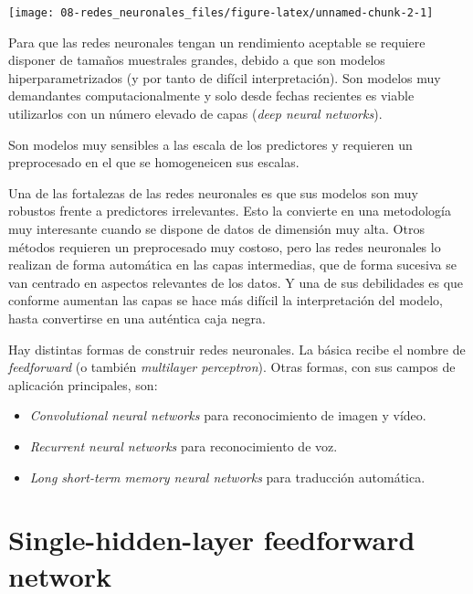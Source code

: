 \documentclass[
  spanish,
]{book}
\theoremstyle{break}
\theoremstyle{definition}
\theoremstyle{definition}
\theoremstyle{definition}
\theoremstyle{remark}
\begin{document}
\begin{center}\texttt{[image: 08-redes\_neuronales\_files/figure-latex/unnamed-chunk-2-1]} \end{center}

Para que las redes neuronales tengan un rendimiento aceptable se requiere disponer de tamaños muestrales grandes, debido a que son modelos hiperparametrizados (y por tanto de difícil interpretación). Son modelos muy demandantes computacionalmente y solo desde fechas recientes es viable utilizarlos con un número elevado de capas (\emph{deep neural networks}).

Son modelos muy sensibles a las escala de los predictores y requieren un preprocesado en el que se homogeneicen sus escalas.

Una de las fortalezas de las redes neuronales es que sus modelos son muy robustos frente a predictores irrelevantes. Esto la convierte en una metodología muy interesante cuando se dispone de datos de dimensión muy alta. Otros métodos requieren un preprocesado muy costoso, pero las redes neuronales lo realizan de forma automática en las capas intermedias, que de forma sucesiva se van centrado en aspectos relevantes de los datos. Y una de sus debilidades es que conforme aumentan las capas se hace más difícil la interpretación del modelo, hasta convertirse en una auténtica caja negra.

Hay distintas formas de construir redes neuronales. La básica recibe el nombre de \emph{feedforward} (o también \emph{multilayer perceptron}). Otras formas, con sus campos de aplicación principales, son:

\begin{itemize}
\item
  \emph{Convolutional neural networks} para reconocimiento de imagen y vídeo.
\item
  \emph{Recurrent neural networks} para reconocimiento de voz.
\item
  \emph{Long short-term memory neural networks} para traducción automática.
\end{itemize}

\hypertarget{single-hidden-layer-feedforward-network}{%
\section{Single-hidden-layer feedforward network}\label{single-hidden-layer-feedforward-network}}
\end{document}
